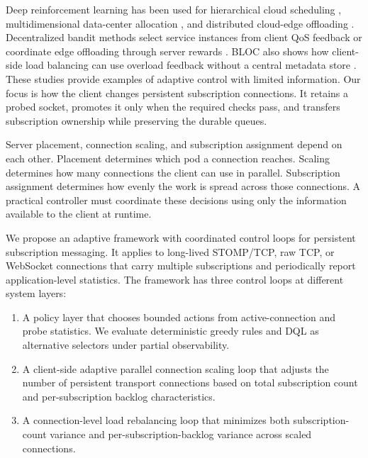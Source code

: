 Deep reinforcement learning has been used for hierarchical cloud scheduling \cite{Zhou2022DRLSelector}, multidimensional data-center allocation \cite{Wei2023TNSM}, and distributed cloud-edge offloading \cite{Nieto2024DRLOffloading}. Decentralized bandit methods select service instances from client QoS feedback \cite{Cilic2025} or coordinate edge offloading through server rewards \cite{Yahya2024}. BLOC also shows how client-side load balancing can use overload feedback without a central metadata store \cite{Bhattacharya2024}. These studies provide examples of adaptive control with limited information. Our focus is how the client changes persistent subscription connections. It retains a probed socket, promotes it only when the required checks pass, and transfers subscription ownership while preserving the durable queues.

Server placement, connection scaling, and subscription assignment depend on each other. Placement determines which pod a connection reaches. Scaling determines how many connections the client can use in parallel. Subscription assignment determines how evenly the work is spread across those connections. A practical controller must coordinate these decisions using only the information available to the client at runtime.

We propose an adaptive framework with coordinated control loops for persistent subscription messaging. It applies to long-lived STOMP/TCP, raw TCP, or WebSocket connections that carry multiple subscriptions and periodically report application-level statistics. The framework has three control loops at different system layers:

\begin{enumerate}
	\item A policy layer that chooses bounded actions from active-connection and probe statistics. We evaluate deterministic greedy rules and DQL as alternative selectors under partial observability.
	
	\item A client-side adaptive parallel connection scaling loop that adjusts the number of persistent transport connections based on total subscription count and per-subscription backlog characteristics.
	
	\item A connection-level load rebalancing loop that minimizes both subscription-count variance and per-subscription-backlog variance across scaled connections.
\end{enumerate}

